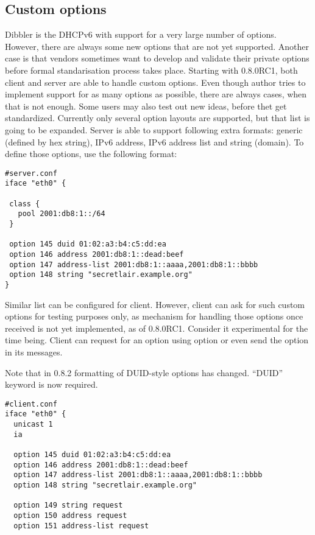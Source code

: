 \subsection{Custom options}
\label{feature-custom-options}
Dibbler is the DHCPv6 with support for a very large number of
options. However, there are always some new options that are not yet
supported. Another case is that vendors sometimes want to develop
and validate their private options before formal standarisation
process takes place. Starting with 0.8.0RC1, both client and server
are able to handle custom options. Even though author tries to
implement support for as many options as possible, there are always
cases, when that is not
enough. Some users may also test out new ideas, before thet get
standardized. Currently only several option layouts are supported, but
that list is going to be expanded. Server is able to support
following extra formats: generic (defined by hex string), IPv6
address, IPv6 address list and string (domain). To define those
options, use the following format:

\begin{lstlisting}
#server.conf
iface "eth0" {

 class {
   pool 2001:db8:1::/64
 }

 option 145 duid 01:02:a3:b4:c5:dd:ea
 option 146 address 2001:db8:1::dead:beef
 option 147 address-list 2001:db8:1::aaaa,2001:db8:1::bbbb
 option 148 string "secretlair.example.org"
}
\end{lstlisting}

Similar list can be configured for client. However, client can ask
for such custom options for testing purposes only, as mechanism for
handling those options once received is not yet implemented, as of
0.8.0RC1. Consider it experimental for the time being. Client can
request for an option using  option or even send the option
in its messages.

Note that in 0.8.2 formatting of DUID-style options has
changed. ``DUID'' keyword is now required.

\begin{lstlisting}
#client.conf
iface "eth0" {
  unicast 1
  ia

  option 145 duid 01:02:a3:b4:c5:dd:ea
  option 146 address 2001:db8:1::dead:beef
  option 147 address-list 2001:db8:1::aaaa,2001:db8:1::bbbb
  option 148 string "secretlair.example.org"

  option 149 string request
  option 150 address request
  option 151 address-list request
\end{lstlisting}

